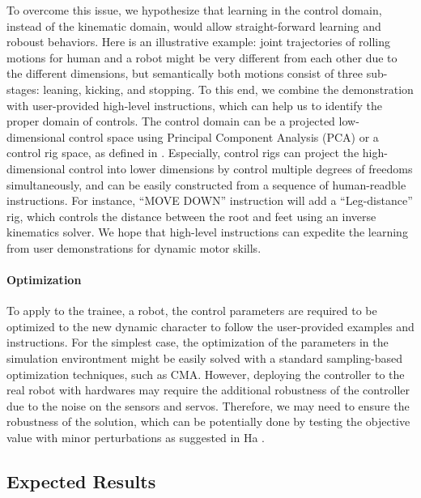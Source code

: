 To overcome this issue, we hypothesize that learning in the control domain,
instead of the kinematic domain, would allow straight-forward learning and
roboust behaviors.
Here is an illustrative example:
joint trajectories of rolling motions for human and a
robot might be very different from each other due to the different
dimensions, but semantically both motions consist of 
three sub-stages: leaning, kicking, and stopping.
To this end, we combine the demonstration with user-provided high-level
instructions, which can help us to identify the proper domain of controls.
The control domain can be a projected low-dimensional control space using
Principal Component Analysis (PCA) or a control rig space, as defined
in \cite{Ha:2014:ITD}.
Especially, control rigs can project the high-dimensional control into
lower dimensions by control multiple degrees of freedoms simultaneously,
and can be easily constructed from a sequence of human-readble 
instructions.
For instance, ``MOVE DOWN'' instruction will add a ``Leg-distance'' rig,
which controls the distance between the root and feet using an inverse
kinematics solver.
We hope that high-level instructions can expedite the learning from
user demonstrations for dynamic motor skills.

\paragraph{Optimization}

To apply to the trainee, a robot, the control parameters are required to be
optimized to the new dynamic character to follow the user-provided 
examples and instructions.
For the simplest case, 
the optimization of the parameters in the simulation environtment
might be easily solved with a standard sampling-based optimization
techniques, such as CMA.
However, deploying the controller to the real robot with hardwares
may require the additional robustness of the controller
due to the noise on the sensors and servos.
Therefore, we may need to ensure the robustness of the solution,
which can be potentially done by testing the objective value 
with minor perturbations as suggested in Ha \etal \cite{Ha:2013:PSB}.

\subsection{Expected Results}

